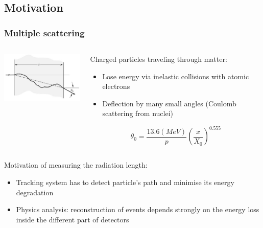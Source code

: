 \documentclass{beamer}
\begin{document}
    \subsection{Motivation}

    \begin{frame}
      \frametitle{Multiple scattering}
      
      \vspace{-0.3cm} 
      \begin{columns}[c]
        \begin{column}{6cm}
          \centering
          \includegraphics[width = 5cm]{Pictures/multiple_scattering.jpg}
        \end{column}
        \begin{column}{6cm}
          \begin{block}{Charged particles traveling through matter:}
            \begin{itemize}
              \item Lose energy via inelastic collisions with atomic electrons
              \item Deflection by many small angles (Coulomb scattering from nuclei)
            \end{itemize}
            \centering
              \[ \theta_0 = \frac{13.6 (MeV)}{p}\left( \frac{x}{X_0}\right)^{0.555}\]
          \end{block}
        \end{column}
      \end{columns}

      \vspace{-0.2cm}
      \begin{block}{Motivation of measuring the radiation length:}
        \begin{itemize}
          \item Tracking system has to detect particle's path and minimise its energy degradation
          \item Physics analysis: reconstruction of events depends strongly on the energy loss inside the different part of detectors
        \end{itemize}
      \end{block}
    \end{frame} 
    
\end{document}
